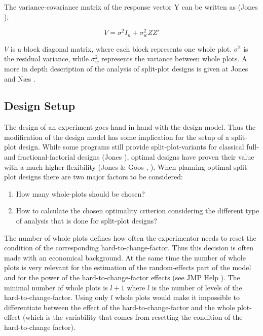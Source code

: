 The variance-covariance matrix of the response vector Y can be written as (Jones \cite{jones:whyandhow}):

$$V = \sigma^2 I_n + \sigma^2_w ZZ'$$


$V$ is a block diagonal matrix, where each block represents one whole plot. $\sigma^2$ is the residual variance, while $\sigma^2_w$ represents the variance between whole plots. A more in depth description of the analysis of split-plot designs is given at Jones \cite{jones:whyandhow} and N\ae s \cite{analysisofsplitplots}.

\subsection{Design Setup}

The design of an experiment goes hand in hand with the design model. Thus the modification of the design model has some implication for the setup of a split-plot design. While some programs still provide split-plot-variants for classical full- and fractional-factorial designs (Jones \cite{jones:whyandhow}), optimal designs have proven their value with a much higher flexibility (Jones \& Goos \cite{jones:optimalalg}, \cite{jones:book}). When planning optimal split-plot designs there are two major factors to be considered: 

\begin{enumerate}
	\item How many whole-plots should be chosen?
	\item How to calculate the chosen optimality criterion considering the different type of analysis that is done for split-plot designs?
\end{enumerate}

The number of whole plots defines how often the experimentor needs to reset the condition of the corresponding hard-to-change-factor. Thus this decision is often made with an economical background. At the same time the number of whole plots is very relevant for the estimation of the random-effects part of the model and for the power of the hard-to-change-factor effects (see JMP Help \cite{JMPHELP:numberwholepots}). The minimal number of whole plots is $l+1$ where $l$ is the number of levels of the hard-to-change-factor. Using only $l$ whole plots would make it impossible to differentiate between the effect of the hard-to-change-factor and the whole plot-effect (which is the variability that comes from resetting the condition of the hard-to-change factor).

